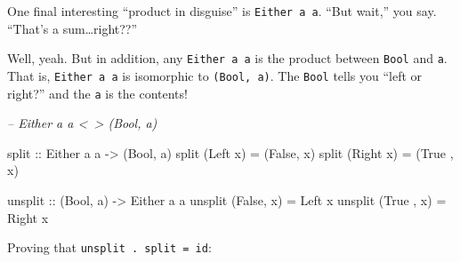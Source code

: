 \documentclass[]{article}
\newenvironment{Shaded}{}{}
\newcommand{\CommentTok}[1]{\textcolor[rgb]{0.38,0.63,0.69}{\textit{#1}}}
\newcommand{\DataTypeTok}[1]{\textcolor[rgb]{0.56,0.13,0.00}{#1}}
\newcommand{\FunctionTok}[1]{\textcolor[rgb]{0.02,0.16,0.49}{#1}}
\newcommand{\NormalTok}[1]{#1}
\newcommand{\OtherTok}[1]{\textcolor[rgb]{0.00,0.44,0.13}{#1}}
\begin{document}
One final interesting ``product in disguise'' is \texttt{Either\ a\ a}. ``But
wait,'' you say. ``That's a sum\ldots{}right??''

Well, yeah. But in addition, any \texttt{Either\ a\ a} is the product between
\texttt{Bool} and \texttt{a}. That is, \texttt{Either\ a\ a} is isomorphic to
\texttt{(Bool,\ a)}. The \texttt{Bool} tells you ``left or right?'' and the
\texttt{a} is the contents!

\begin{Shaded}
\begin{Highlighting}[]
\CommentTok{-- Either a a <~> (Bool, a)}

\OtherTok{split ::} \DataTypeTok{Either}\NormalTok{ a a }\OtherTok{->}\NormalTok{ (}\DataTypeTok{Bool}\NormalTok{, a)}
\NormalTok{split (}\DataTypeTok{Left}\NormalTok{  x) }\FunctionTok{=}\NormalTok{ (}\DataTypeTok{False}\NormalTok{, x)}
\NormalTok{split (}\DataTypeTok{Right}\NormalTok{ x) }\FunctionTok{=}\NormalTok{ (}\DataTypeTok{True}\NormalTok{ , x)}

\OtherTok{unsplit ::}\NormalTok{ (}\DataTypeTok{Bool}\NormalTok{, a) }\OtherTok{->} \DataTypeTok{Either}\NormalTok{ a a}
\NormalTok{unsplit (}\DataTypeTok{False}\NormalTok{, x) }\FunctionTok{=} \DataTypeTok{Left}\NormalTok{  x}
\NormalTok{unsplit (}\DataTypeTok{True}\NormalTok{ , x) }\FunctionTok{=} \DataTypeTok{Right}\NormalTok{ x}
\end{Highlighting}
\end{Shaded}

Proving that \texttt{unsplit\ .\ split\ =\ id}:
\end{document}
